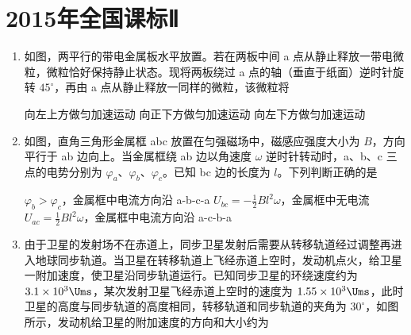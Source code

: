 \documentclass[\gkver]{gaokaozhenti}
\begin{document}
\chapter{2015年全国课标Ⅱ}

\begin{enumerate}
\item
如图，两平行的带电金属板水平放置。若在两板中间 a 点从静止释放一带电微粒，微粒恰好保持静止状态。现将两板绕过 a 点的轴（垂直于纸面）逆时针旋转 $45^\circ$，再由 a 点从静止释放一同样的微粒，该微粒将


{向左上方做匀加速运动}
{向正下方做匀加速运动}
{向左下方做匀加速运动}


\item
如图，直角三角形金属框 abc 放置在匀强磁场中，磁感应强度大小为 $B$，方向平行于 ab 边向上。当金属框绕 ab 边以角速度 $\omega$ 逆时针转动时，a、b、c 三点的电势分别为 $\varphi_{a}$、$\varphi_{b}$、$\varphi_{c}$。已知 bc 边的长度为 $l$。下列判断正确的是


{$\varphi_{b}>\varphi_{c}$，金属框中电流方向沿 a-b-c-a}
{$U_{bc}=-\frac{1}{2}Bl^{2}\omega$，金属框中无电流}
{$U_{ac}=\frac{1}{2}Bl^{2}\omega$，金属框中电流方向沿 a-c-b-a}


\item
由于卫星的发射场不在赤道上，同步卫星发射后需要从转移轨道经过调整再进入地球同步轨道。当卫星在转移轨道上飞经赤道上空时，发动机点火，给卫星一附加速度，使卫星沿同步轨道运行。已知同步卫星的环绕速度约为 $3.1\times10^{3}\Ums$，某次发射卫星飞经赤道上空时的速度为 $1.55\times10^{3}\Ums$，此时卫星的高度与同步轨道的高度相同，转移轨道和同步轨道的夹角为 $30^\circ$，如图所示，发动机给卫星的附加速度的方向和大小约为


\end{enumerate}
\end{document}
